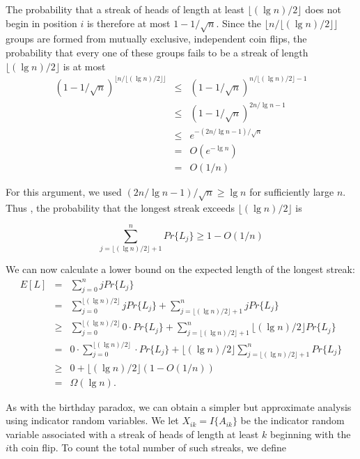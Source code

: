 \documentclass[12pt]{article}
\begin{document}
The probability that a streak of heads of length at least $\lfloor (\lg n)/2 \rfloor$ does not begin in position $i$ is therefore at most $1 - 1 / \sqrt n$. Since the $\lfloor n / \lfloor (\lg n)/2 \rfloor \rfloor$ groups are formed from mutually exclusive, independent coin flips, the probability that every one of these groups fails to be a streak of length $\lfloor (\lg n)/2 \rfloor$ is at most
\begin{eqnarray*}
  (1 - 1 / \sqrt n)^{\lfloor n/ {\lfloor (\lg n)/2 \rfloor} \rfloor}
  &\le& (1 - 1 / \sqrt n)^{n/ {\lfloor (\lg n)/2 \rfloor} - 1} \\
  &\le& (1 - 1 / \sqrt n)^{2n/ {\lg n} - 1} \\
  &\le& e^{-(2n/ {\lg n} -1)/{\sqrt n}} \\
  &=& O(e^{- \lg n}) \\
  &=& O(1/n)
\end{eqnarray*}

For this argument, we used $(2n / {\lg n} - 1) / {\sqrt n} \ge \lg n$ for sufficiently large $n$. \\

Thus , the probability that the longest streak exceeds $\lfloor (\lg n)/2 \rfloor$ is

\begin{equation*}
  \sum_{j = \lfloor (\lg n)/2 \rfloor + 1}^{n} Pr \{ L_j \} \ge 1 - O(1/n)
\end{equation*}

We can now calculate a lower bound on the expected length of the longest streak:
\begin{eqnarray*}
  E[L]
  &=& \sum_{j=0}^{n} j Pr \{ L_j \} \\
  &=& \sum_{j=0}^{\lfloor (\lg n)/2 \rfloor} j Pr \{ L_j \}
      + \sum_{j = \lfloor (\lg n)/2 \rfloor + 1}^{n} j Pr \{ L_j \} \\
  &\ge& \sum_{j=0}^{\lfloor (\lg n)/2 \rfloor} 0 \cdot Pr \{ L_j \}
      + \sum_{j = \lfloor (\lg n)/2 \rfloor + 1}^{n} 
      \lfloor (\lg n)/2 \rfloor Pr \{ L_j \} \\
  &=& 0 \cdot \sum_{j=0}^{\lfloor (\lg n)/2 \rfloor} \cdot Pr \{ L_j \}
      + \lfloor (\lg n)/2 \rfloor \sum_{j = \lfloor (\lg n)/2 \rfloor + 1}^{n}
      Pr \{ L_j \} \\
  &\ge& 0 + \lfloor (\lg n)/2 \rfloor (1 - O(1/n)) \\
  &=& \Omega (\lg n).
\end{eqnarray*}

As with the birthday paradox, we can obtain a simpler but approximate analysis using indicator random variables. We let $X_{ik} = I \{ A_{ik} \}$ be the indicator random variable associated with a streak of heads of length at least $k$ beginning with the $i$th coin flip. To count the total number of such streaks, we define
\end{document}

